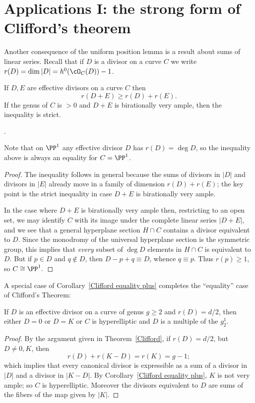 \section{Applications I: the strong form of Clifford's theorem}

Another consequence of the uniform position lemma is a result about sums of linear series.
Recall that if $D$ is a divisor on a curve $C$ we write $r(D) = \dim |D| = h^0(\cO_C(D))-1$.


\begin{corollary}\label{Clifford equality plus}
If $D,E$ are effective divisors on a curve $C$ then
$$
r(D+E) \geq r(D)+r(E).
$$
If the genus of $C$ is $>0$ and $D+E$ is birationally very ample, then the inequality is strict.
\end{corollary}.

Note that on $\PP^1$ any effective divisor $D$ has $r(D) = \deg D$, so the inequality above is
always an equality for $C = \PP^1$.

\begin{proof}
 The inequality follows in general because the sums of divisors in $|D|$ and divisors in $|E|$ already move in 
 a family of dimension $r(D)+r(E)$; the key point is the strict inequality in case $D+E$ is birationally very ample.
 
In the case where $D+E$ is birationally very ample then, restricting to an open set,
we may identify $C$ with its image under the complete linear series $|D+E|$, and we see that a general hyperplane section $H\cap C$ contains a divisor equivalent to $D$. Since the monodromy of the universal hyperplane section
is the symmetric group, this implies that \emph{every} subset of $\deg D$ elements in $H\cap C$ is
equivalent to $D$. But if $p\in D$ and $q\notin D$, then $D-p+q \equiv D$, whence $q\equiv p$. Thus
$r(p)\geq 1$, so $C\cong \PP^1.$
\end{proof}

A special case of Corollary~\ref{Clifford equality plus} completes the ``equality'' case of Clifford's Theorem:

\begin{corollary}\label{Clifford equality}
If $D$ is an effective divisor on a curve of genus $g\geq 2$ and $r(D) = d/2$, then either $D= 0$ or 
$D=K$ or $C$ is hyperelliptic and $D$ is a multiple of the $g^1_2$.
\end{corollary}

\begin{proof}
  By the argument given in Theorem~\ref{Clifford}, if $r(D) = d/2$, but $D\neq 0,K$, then
$$
r(D) + r(K-D) = r(K) = g-1;
$$
which implies that every canonical divisor is expressible as a sum of a divisor in $|D|$ and a divisor in $|K-D|$.
By Corollary~\ref{Clifford equality plus}, $K$ is not very ample; so $C$ is hyperelliptic. Moreover the
divisors equivalent to $D$ are sums of the fibers of the map given by $|K|$.
\end{proof}

